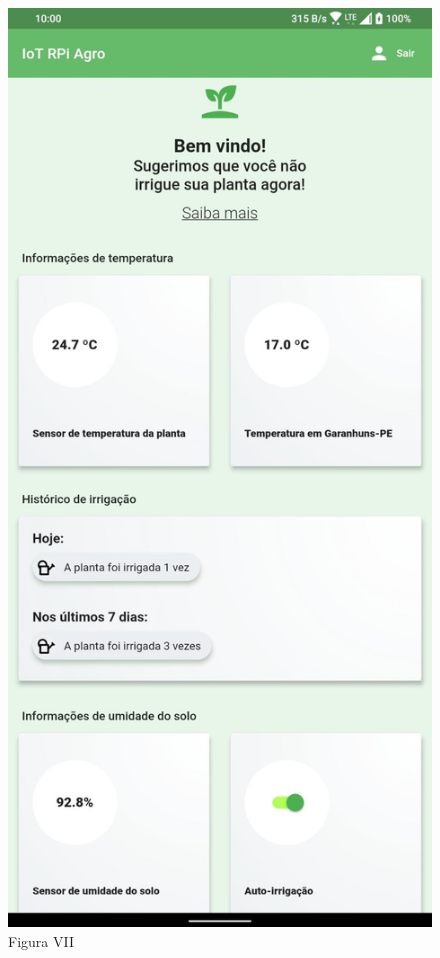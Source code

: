 \documentclass[eso]{bcc}
\begin{document}
\begin{figure}[htbp]
\centerline{\includegraphics[scale=.25]{Figuras/figura-vii.jpg}}
\caption{Figura VII}\label{fig-vii}
\end{figure}
\end{document}
